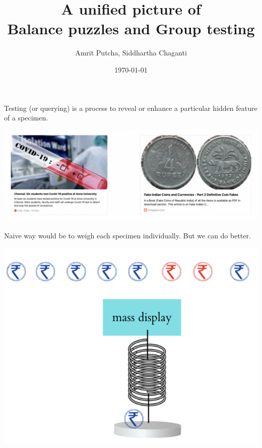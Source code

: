 \documentclass{beamer} %
\title[CCP]{A unified picture of \\Balance puzzles and Group testing }
\institute[IITM]{Indian Institute of Technology Madras}
\author{Amrit Putcha, Siddhartha Chaganti}
\date{\today}
\begin{document}
\begin{frame}
	\titlepage
\end{frame}

\begin{frame}
	\begin{block}{Testing (or querying) is a process to reveal or enhance a particular hidden feature of a specimen.}
		
	\end{block}
	\begin{center}
		\includegraphics[scale = 0.4]{Figures/amrit1.png}
	\end{center}
\end{frame}
\begin{frame}
	\begin{block}{Naive way would be to weigh each specimen individually. But we can do better.}
		
	\end{block}
	\begin{center}
		\includegraphics[scale = 0.5]{Figures/amrit2.png}
	\end{center}
\end{frame}
\end{document}
